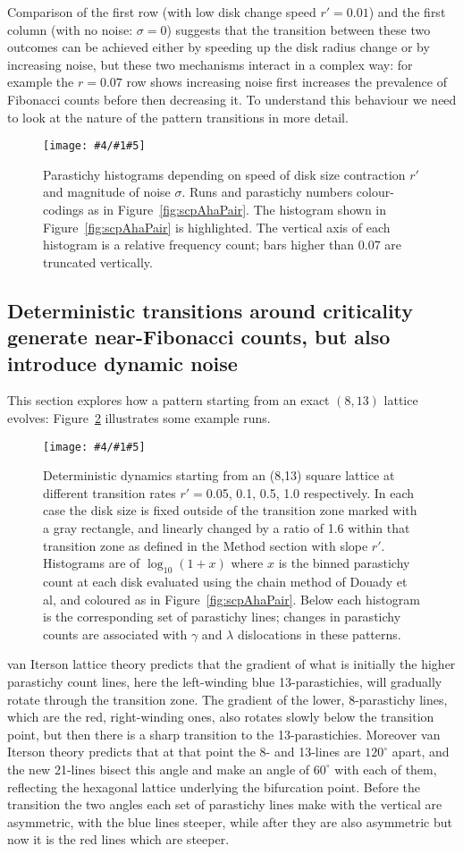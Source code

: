 \documentclass[a4paper,10pt]{amsart}
\newlength{\jfigwidth}
\newcommand{\pdffig}[3]{\jdofig{#1}{#2}{#3}{Figures}{.pdf}}
\newcommand{\jdofig}[5]{
	\begin{figure}\centering\texttt{[image: \#4/\#1\#5]} \caption{#2}\label{fig:#1}\end{figure}
}
\begin{document}
Comparison of the first row (with low disk change speed $r'=0.01$) and the first column (with no noise: $\sigma=0$) suggests that the transition between these two outcomes can be achieved either by speeding up the disk radius change or by increasing noise, but these two mechanisms interact in a complex way: for example the $r=0.07$ row shows increasing noise first increases the prevalence of Fibonacci counts before then decreasing it. To understand this behaviour we need to look at the nature of the pattern transitions in more detail.

\pdffig{scpTo55}{Parastichy histograms depending on speed of disk size contraction $r'$ and magnitude of noise $\sigma$.  Runs and parastichy numbers colour-codings as in Figure~\ref{fig:scpAhaPair}. The histogram shown in Figure~\ref{fig:scpAhaPair} is highlighted. The vertical axis of each histogram is a relative frequency count; bars higher than 0.07 are truncated vertically.}{1}


\subsection{Deterministic transitions around criticality generate near-Fibonacci counts, but also introduce dynamic noise}

This section explores how a pattern starting from an exact $(8,13)$ lattice evolves: Figure~\ref{fig:scpDet813} illustrates some example runs.
 \pdffig{scpDet813}{Deterministic dynamics starting from an (8,13) square lattice at different transition rates $r'=$0.05, 0.1, 0.5, 1.0 respectively. In each case the disk size is fixed outside of the transition zone marked with a gray rectangle, and linearly changed by a ratio of 1.6 within that transition zone as defined in the Method section with slope $r'$.  Histograms are of $\log_{10} (1+x) $ where $x$ is the binned parastichy count at each disk evaluated using the chain method of Douady et al, and coloured as in Figure~\ref{fig:scpAhaPair}. Below each histogram is the corresponding set of parastichy lines; changes in parastichy counts are associated with $\gamma$ and $\lambda$ dislocations in these patterns.}{.9}
%
 van Iterson lattice theory predicts that the gradient of what is initially the higher parastichy count lines, here the left-winding blue 13-parastichies, will gradually rotate through the transition zone. The gradient of the lower, 8-parastichy lines, which are the red, right-winding ones, also rotates slowly below the transition point, but then there is a sharp transition to the 13-parastichies. Moreover  van Iterson theory predicts that at that point the 8- and 13-lines are $120^{\circ}$ apart, and the new 21-lines bisect this angle and make an angle of $60^\circ$ with each of them, reflecting the hexagonal lattice underlying the bifurcation point. Before the transition the two angles each set of parastichy lines make with the vertical are asymmetric, with the blue lines steeper, while after they are also asymmetric but now it is the red lines which are steeper.
 
\end{document}
